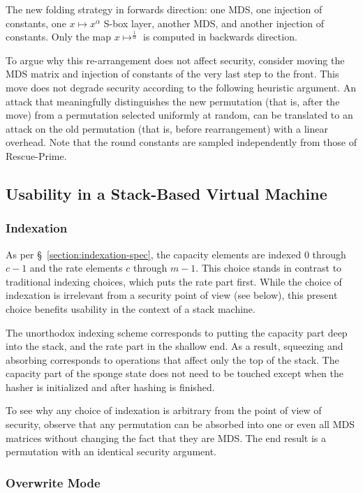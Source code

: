 \documentclass[a4paper]{article}
\begin{document}
The new folding strategy in forwards direction: one MDS, one injection of constants, one $x \mapsto x^\alpha$ S-box layer, another MDS, and another injection of constants. Only the map $x \mapsto ^{\frac{1}{\alpha}}$ is computed in backwards direction.

To argue why this re-arrangement does not affect security, consider moving the MDS matrix and injection of constants of the very last step to the front. This move does not degrade security according to the following heuristic argument. An attack that meaningfully distinguishes the new permutation (that is, after the move) from a permutation selected uniformly at random, can be translated to an attack on the old permutation (that is, before rearrangement) with a linear overhead. Note that the round constants are sampled independently from those of Rescue-Prime.

\subsection{Usability in a Stack-Based Virtual Machine}

\subsubsection{Indexation}

As per \S~\ref{section:indexation-spec}, the capacity elements are indexed $0$ through $c-1$ and the rate elements $c$ through $m-1$. This choice stands in contrast to traditional indexing choices, which puts the rate part first. While the choice of indexation is irrelevant from a security point of view (see below), this present choice benefits usability in the context of a stack machine.

The unorthodox indexing scheme corresponds to putting the capacity part deep into the stack, and the rate part in the shallow end. As a result, squeezing and absorbing corresponds to operations that affect only the top of the stack. The capacity part of the sponge state does not need to be touched except when the hasher is initialized and after hashing is finished.

To see why any choice of indexation is arbitrary from the point of view of security, observe that any permutation can be absorbed into one or even all MDS matrices without changing the fact that they are MDS. The end result is a permutation with an identical security argument.

\subsubsection{Overwrite Mode}
\end{document}
